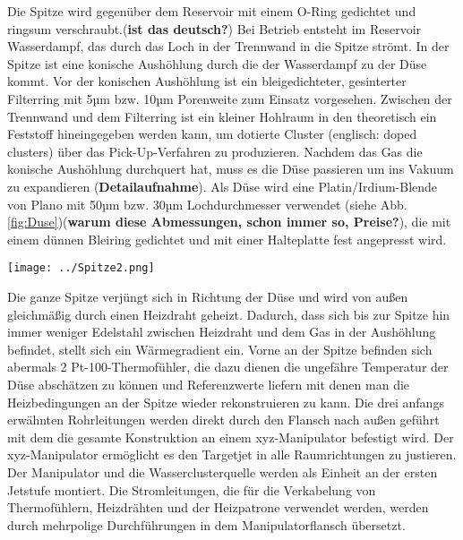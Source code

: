 Die Spitze wird gegenüber dem Reservoir mit einem O-Ring gedichtet und ringsum verschraubt.(\textbf{ist das deutsch?}) Bei Betrieb entsteht im Reservoir Wasserdampf, das durch das Loch in der Trennwand in die Spitze strömt. In der Spitze ist eine konische Aushöhlung durch die der Wasserdampf zu der Düse kommt. Vor der konischen Aushöhlung ist ein bleigedichteter, gesinterter Filterring mit 5µm bzw. 10µm Porenweite zum Einsatz vorgesehen. Zwischen der Trennwand und dem Filterring ist ein kleiner Hohlraum in den theoretisch ein Feststoff hineingegeben werden kann, um dotierte Cluster (englisch: doped clusters) über das Pick-Up-Verfahren zu produzieren. Nachdem das Gas die konische Aushöhlung durchquert hat, muss es die Düse passieren um ins Vakuum zu expandieren (\textbf{Detailaufnahme}). Als Düse wird eine Platin/Irdium-Blende von Plano mit 50µm bzw. 30µm Lochdurchmesser verwendet (siehe Abb. \ref{fig:Duse})(\textbf{warum diese Abmessungen, schon immer so, Preise?}), die mit einem dünnen Bleiring gedichtet und mit einer Halteplatte fest angepresst wird. %

\begin{center} 
\begin{minipage}{\linewidth}
\texttt{[image: ../Spitze2.png]}%
  \label{fig:Spitze2}
\end{minipage} 
\end{center} 

Die ganze Spitze verjüngt sich in Richtung der Düse und wird von außen gleichmäßig durch einen Heizdraht geheizt. Dadurch, dass sich bis zur Spitze hin immer weniger Edelstahl zwischen Heizdraht und dem Gas in der Aushöhlung befindet, stellt sich ein Wärmegradient ein. Vorne an der Spitze befinden sich abermals 2 Pt-100-Thermofühler, die dazu dienen die ungefähre Temperatur der Düse abschätzen zu können und Referenzwerte liefern mit denen man die Heizbedingungen an der Spitze wieder rekonstruieren zu kann. 
%
Die drei anfangs erwähnten Rohrleitungen werden direkt durch den Flansch nach außen geführt mit dem die gesamte Konstruktion an einem xyz-Manipulator befestigt wird. Der xyz-Manipulator ermöglicht es den Targetjet in alle Raumrichtungen zu justieren. Der Manipulator und die Wasserclusterquelle werden als Einheit an der ersten Jetstufe montiert. 
Die Stromleitungen, die für die Verkabelung von Thermofühlern, Heizdrähten und der Heizpatrone verwendet werden, werden durch mehrpolige Durchführungen in dem Manipulatorflansch übersetzt. 

